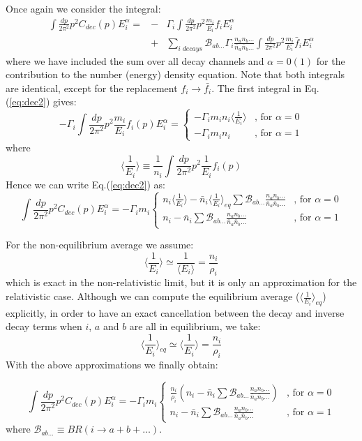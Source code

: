 \documentclass[preprint,notoc]{JHEP3}
\def\to{\rightarrow}
\def\be{\begin{equation}}
\def\ee{\end{equation}}
\def\bea{\begin{eqnarray}}
\def\eea{\end{eqnarray}}
\def\to{\rightarrow}
\begin{document}
Once again we consider the integral:
\bea
\int \frac{dp}{2 \pi^2} p^2 C_{dec}(p) E_i^{\alpha} = 
 & - & \Gamma_i \int \frac{dp}{2 \pi^2} p^2 \frac{m_i}{E_i} f_i E_i^{\alpha}
 \nonumber \\
 & + & \sum_{i \; decays} \mathcal{B}_{ab\ldots}
\Gamma_i \frac{n_a n_b \ldots}{\bar{n}_a \bar{n}_b \ldots} \int \frac{dp}{2 \pi^2}
p^2 \frac{m_i}{E_i} \bar{f}_{i} E_i^\alpha \label{eq:dec2}
\eea
where we have included the sum over all decay channels and $\alpha = 0 (1)$
for the contribution to the number (energy) density equation.
Note that both integrals are identical, except for the replacement
$f_i \to \bar{f_i}$. The first integral in Eq.(\ref{eq:dec2}) gives:
\be
-\Gamma_i \int \frac{dp}{2 \pi^2} p^2 \frac{m_i}{E_i} f_i(p) E_i^{\alpha} =
\left\{ \begin{array}{rl} -\Gamma_i m_i n_i \langle \frac{1}{E_i} \rangle  & \mbox{, for $\alpha = 0$} \\
-\Gamma_i m_i n_i &\mbox{, for $\alpha = 1$}
\end{array} \right. \label{eq:dec1a}
\ee
where
\be
\langle \frac{1}{E_i} \rangle \equiv \frac{1}{n_i} \int \frac{dp}{2 \pi^2} p^2
\frac{1}{E_i} f_i(p)
\ee
Hence we can write Eq.(\ref{eq:dec2}) as:
\be
\int \frac{dp}{2 \pi^2} p^2 C_{dec}(p) E_i^{\alpha} = -\Gamma_i m_i 
\left\{ \begin{array}{ll} n_i \langle \frac{1}{E_i} \rangle - \bar{n}_i  \langle
\frac{1}{E_i}
\rangle_{eq} \sum \mathcal{B}_{ab\ldots}
 \frac{n_a n_b\ldots}{\bar{n}_a \bar{n}_b\ldots}  & \mbox{, for $\alpha = 0$}  \\
 n_i - \bar{n}_i \sum \mathcal{B}_{ab\ldots}
 \frac{n_a n_b\ldots}{\bar{n}_a \bar{n}_b\ldots}  & \mbox{, for $\alpha = 1$}
\end{array} \right. \label{eq:decfin}
\ee


For the non-equilibrium average we assume:
\be
\langle \frac{1}{E_i} \rangle \simeq \frac{1}{\langle E_i \rangle} =
\frac{n_i}{\rho_i}
\ee
which is exact in the non-relativistic limit, but it is only an approximation
for the relativistic case.
Although we can compute the equilibrium average ($\langle
\frac{1}{E_i}\rangle_{eq}$)
explicitly, in order to have an exact cancellation between 
the decay and inverse decay terms when $i$, $a$ and $b$ are all in equilibrium,
we take:
\be
\langle \frac{1}{E_i} \rangle_{eq} \simeq \langle \frac{1}{E_i} \rangle =
\frac{n_i}{\rho_i}
\ee
With the above approximations we finally obtain:

\be
\int \frac{dp}{2 \pi^2} p^2 C_{dec}(p) E_i^{\alpha} = 
 -\Gamma_i  m_i \left\{ \begin{array}{ll}\frac{n_i}{\rho_i}\left( n_i -
 \bar{n}_i \sum \mathcal{B}_{ab\ldots}
 \frac{n_a n_b \ldots}{\bar{n}_a \bar{n}_b \ldots} \right)   &
 \mbox{, for $\alpha = 0$}
 \\
 n_i - \bar{n}_i \sum \mathcal{B}_{ab\ldots}
 \frac{n_a n_b \ldots}{\bar{n}_a \bar{n}_b \ldots}  & \mbox{, for $\alpha = 1$}
\end{array} \right. \label{eq:decfin}
\ee
where $\mathcal{B}_{ab\ldots} \equiv BR(i\to a+b+\ldots)$.
\end{document}
